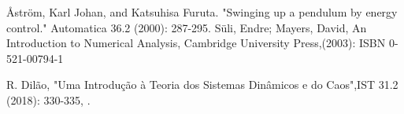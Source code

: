 \documentclass[prd,twocolumn,nofootinbib,showpacs]{revtex4-1}
\begin{document}
\begin{thebibliography}{99}

 Åström, Karl Johan, and Katsuhisa Furuta. "Swinging up a pendulum by energy control." Automatica 36.2 (2000): 287-295.
Süli, Endre; Mayers, David, An Introduction to Numerical Analysis, Cambridge University Press,(2003): ISBN 0-521-00794-1 

 R. Dilão, "Uma Introdução à Teoria dos Sistemas Dinâmicos e do Caos",IST 31.2 (2018): 330-335, .

\end{thebibliography}
\end{document}
